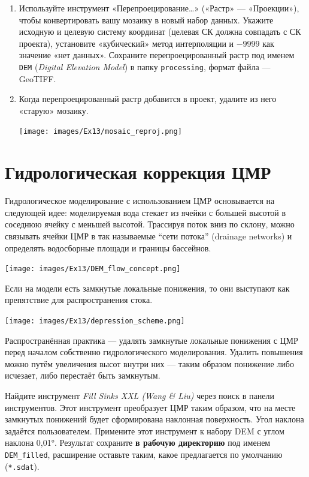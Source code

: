 \documentclass[
  12pt,
]{book}
\begin{document}
\begin{enumerate}
\def\labelenumi{\arabic{enumi}.}
\setcounter{enumi}{9}
\item
  Используйте инструмент «Перепроецирование\ldots» («Растр» --- «Проекции»), чтобы конвертировать вашу мозаику в новый набор данных. Укажите исходную и целевую систему координат (целевая СК должна совпадать с СК проекта), установите «кубический» метод интерполяции и \(-9999\) как значение «нет данных». Сохраните перепроецированный растр под именем \texttt{DEM} (\emph{Digital Elevation Model}) в папку \texttt{processing}, формат файла --- GeoTIFF.
\item
  Когда перепроецированный растр добавится в проект, удалите из него «старую» мозаику.

  \texttt{[image: images/Ex13/mosaic\_reproj.png]}
\end{enumerate}

\hypertarget{hydrodem-preprocessing}{%
\section{Гидрологическая коррекция ЦМР}\label{hydrodem-preprocessing}}

Гидрологическое моделирование с использованием ЦМР основывается на следующей идее: моделируемая вода стекает из ячейки с большей высотой в соседнюю ячейку с меньшей высотой. Трассируя поток вниз по склону, можно связывать ячейки ЦМР в так называемые ``сети потока'' (drainage networks) и определять водосборные площади и границы бассейнов.

\texttt{[image: images/Ex13/DEM\_flow\_concept.png]}

Если на модели есть замкнутые локальные понижения, то они выступают как препятствие для распространения стока.

\texttt{[image: images/Ex13/depression\_scheme.png]}

Распространённая практика --- удалять замкнутые локальные понижения с ЦМР перед началом собственно гидрологического моделирования. Удалить повышения можно путём увеличения высот внутри них --- таким образом понижение либо исчезает, либо перестаёт быть замкнутым.

Найдите инструмент \emph{Fill Sinks XXL (Wang \& Liu)} через поиск в панели инструментов. Этот инструмент преобразует ЦМР таким образом, что на месте замкнутых понижений будет сформирована наклонная поверхность. Угол наклона задаётся пользователем. Примените этот инструмент к набору DEM с углом наклона 0,01°. Результат сохраните \textbf{в рабочую директорию} под именем \texttt{DEM\_filled}, расширение оставьте таким, какое предлагается по умолчанию (\texttt{*.sdat}).
\end{document}
